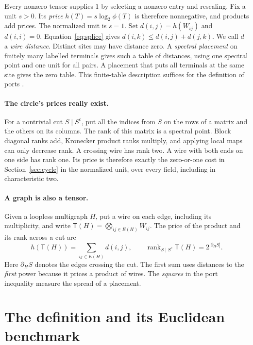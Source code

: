 \documentclass[11pt]{article}
\theoremstyle{definition}
\newcommand{\Gten}{\mathsf T}
\newcommand{\rank}{\operatorname{rank}}
\begin{document}
Every nonzero tensor supplies \(1\) by selecting a nonzero entry and
rescaling. Fix a unit \(s>0\). Its \emph{price}
\(h(T)=s\log_2\phi(T)\) is therefore nonnegative, and products add
prices. The normalized unit is \(s=1\). Set \(d(i,j)=h(W_{ij})\) and
\(d(i,i)=0\). Equation~\eqref{eq:splice} gives
\(d(i,k)\le d(i,j)+d(j,k)\). We call \(d\) a \emph{wire distance}.
Distinct sites may have distance zero. A \emph{spectral placement} on
finitely many labelled terminals gives such a table of distances, using
one spectral point and one unit for all pairs. A placement that puts all
terminals at the same site gives the zero table. This
finite-table description suffices for the definition of ports
\cite{euclid}.

\paragraph{The circle's prices really exist.}
For a nontrivial cut \(S\mid S^c\), put all the indices from \(S\) on the
rows of a matrix and the others on its columns. The rank of this matrix
is a spectral point. Block diagonal ranks add, Kronecker product ranks
multiply, and applying local maps can only decrease rank. A crossing wire
has rank two. A wire with both ends on one side has rank one. Its price is
therefore exactly the zero-or-one cost in Section~\ref{sec:cycle} in
the normalized unit, over
every field, including in characteristic two.

\paragraph{A graph is also a tensor.}
Given a loopless multigraph \(H\), put a wire on each edge, including its
multiplicity, and write \(\Gten(H)=\bigotimes_{ij\in E(H)}W_{ij}\).
The price of the product and its rank across a cut are
\begin{equation}
 h(\Gten(H))=\sum_{ij\in E(H)}d(i,j),\qquad
 \rank_{S\mid S^c}\Gten(H)=2^{|\partial_H S|}.
 \label{eq:graph-price}
\end{equation}
Here \(\partial_H S\) denotes the edges crossing the cut. The first sum
uses distances to the \emph{first} power because it prices a product of
wires. The \emph{squares} in the port inequality measure the spread of a
placement.

\section{The definition and its Euclidean benchmark}
\label{sec:definition}
\end{document}
